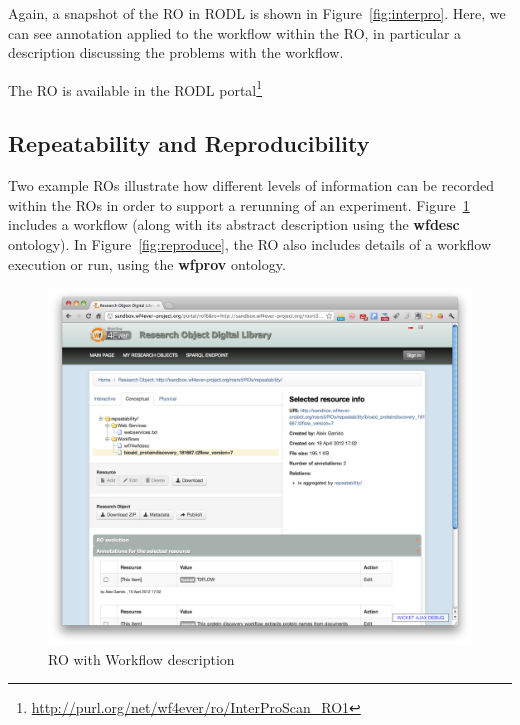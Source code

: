 Again, a snapshot of the RO in RODL is shown in
Figure~\ref{fig:interpro}. Here, we can see annotation applied to the
workflow within the RO, in particular a description discussing the
problems with the workflow. 

The RO is available in the RODL portal\footnote{\url{http://purl.org/net/wf4ever/ro/InterProScan_RO1}}

\subsection{Repeatability and Reproducibility}

Two example ROs illustrate how different levels of information can be
recorded within the ROs in order to support a rerunning of an
experiment. Figure~\ref{fig:repeat} includes a workflow (along with
its abstract description using the \textbf{wfdesc} ontology). In
Figure~\ref{fig:reproduce}, the RO also includes details of a workflow
execution or run, using the \textbf{wfprov} ontology.

\begin{figure}[h]
  \centering
  \includegraphics[width=\picwidth]{Figures/repeat}
 \caption{RO with Workflow description}
  \label{fig:repeat}
\end{figure}


